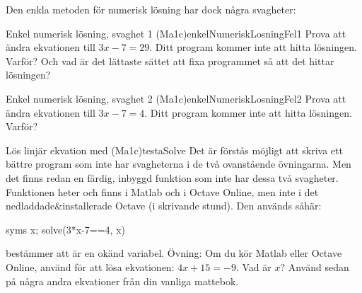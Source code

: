 \newpage
Den enkla metoden för numerisk lösning har dock några svagheter:

\begin{matteovning}{Enkel numerisk lösning, svaghet 1 (Ma1c)}{enkelNumeriskLosningFel1}
Prova att ändra ekvationen till $3x-7=29$. Ditt program kommer inte att hitta lösningen. Varför? Och vad är det lättaste sättet att fixa programmet så att det hittar lösningen?
\end{matteovning}

\begin{matteovning}{Enkel numerisk lösning, svaghet 2 (Ma1c)}{enkelNumeriskLosningFel2}
Prova att ändra ekvationen till $3x-7=4$. Ditt program kommer inte att hitta lösningen. Varför?
\end{matteovning}


\begin{matteovning}{Lös linjär ekvation med  (Ma1c)}{testaSolve}
Det är förstås möjligt att skriva ett bättre program som inte har svagheterna i de två ovanstående övningarna. Men det finns redan en färdig, inbyggd funktion som inte har dessa två svagheter. Funktionen heter  och finns i Matlab och i Octave Online, men inte i det nedladdade\&installerade Octave (i skrivande stund). Den används såhär:

\vspace{10pt}
\begin{matlab}
syms x;
solve(3*x-7==4, x)
\end{matlab}

 bestämmer att  är en okänd variabel.
\newline
\newline
Övning: Om du kör Matlab eller Octave Online, använd  för att lösa ekvationen: $4x+15=-9$. Vad är $x$?
\newline
\newline
Använd sedan  på några andra ekvationer från din vanliga mattebok.
\end{matteovning}

